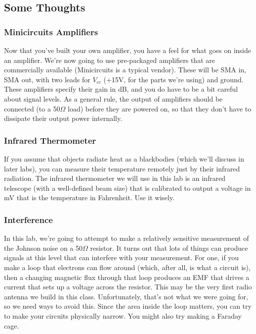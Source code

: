 \documentclass[11pt]{article}
\begin{document}
\subsection*{Some Thoughts}

\subsubsection*{Minicircuits Amplifiers}

Now that you've built your own amplifier, you have a feel for what goes on inside an amplifier.  We're
now going to use pre-packaged amplifiers that are commercially available (Minicircuits is a typical vendor).
These will be SMA in, SMA out, with two leads for $V_{cc}$ (+15V, for the parts we're using) and ground.
These amplifiers specify their gain in dB, and you do have to be a bit careful about signal levels.
As a general rule, the output of amplifiers should be connected (to a 50$\Omega$ load) before they are
powered on, so that they don't have to dissipate their output power internally.

\subsubsection*{Infrared Thermometer}

If you assume that objects radiate heat as a blackbodies (which we'll discuss in later labs), you
can measure their temperature remotely just by their infrared radiation.  The infrared thermometer
we will use in this lab is an infrared telescope (with a well-defined beam size) that is
calibrated to output a voltage in mV that is the temperature in Fahrenheit.  Use it wisely.

\subsubsection*{Interference}

In this lab, we're going to attempt to make a relatively sensitive measurement of the Johnson
noise on a 50$\Omega$ resistor.  It turns out that lots of things can produce signals at this 
level that can interfere with your measurement.  For one, if you make a loop that electrons can
flow around (which, after all, is what a circuit is), then a changing magnetic flux through that
loop produces an EMF that drives a current that sets up a voltage across the resistor.  This may
be the very first radio antenna we build in this class.  Unfortunately, that's not what we were
going for, so we need ways to avoid this.  Since the area inside the loop matters, you can try to
make your circuits physically narrow.  You might also try making a Faraday cage.
\end{document}
